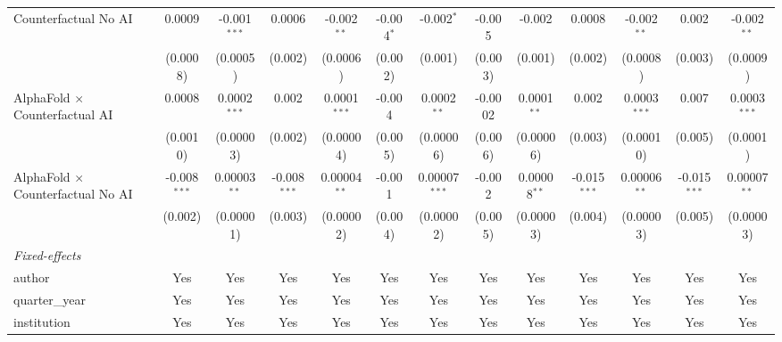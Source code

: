 \begin{tabular}{lcccccccccccc}
   Counterfactual No AI                     & 0.0009         & -0.001$^{***}$ & 0.0006         & -0.002$^{**}$  & -0.004$^{*}$   & -0.002$^{*}$    & -0.005         & -0.002         & 0.0008         & -0.002$^{**}$  & 0.002          & -0.002$^{**}$\\   
                                            & (0.0008)       & (0.0005)       & (0.002)        & (0.0006)       & (0.002)        & (0.001)         & (0.003)        & (0.001)        & (0.002)        & (0.0008)       & (0.003)        & (0.0009)\\   
   AlphaFold $\times$ Counterfactual AI     & 0.0008         & 0.0002$^{***}$ & 0.002          & 0.0001$^{***}$ & -0.004         & 0.0002$^{**}$   & -0.0002        & 0.0001$^{**}$  & 0.002          & 0.0003$^{***}$ & 0.007          & 0.0003$^{***}$\\   
                                            & (0.0010)       & (0.00003)      & (0.002)        & (0.00004)      & (0.005)        & (0.00006)       & (0.006)        & (0.00006)      & (0.003)        & (0.00010)      & (0.005)        & (0.0001)\\   
   AlphaFold $\times$ Counterfactual No AI  & -0.008$^{***}$ & 0.00003$^{**}$ & -0.008$^{***}$ & 0.00004$^{**}$ & -0.001         & 0.00007$^{***}$ & -0.002         & 0.00008$^{**}$ & -0.015$^{***}$ & 0.00006$^{**}$ & -0.015$^{***}$ & 0.00007$^{**}$\\   
                                            & (0.002)        & (0.00001)      & (0.003)        & (0.00002)      & (0.004)        & (0.00002)       & (0.005)        & (0.00003)      & (0.004)        & (0.00003)      & (0.005)        & (0.00003)\\   
   \midrule
   \emph{Fixed-effects}\\
   author                                   & Yes            & Yes            & Yes            & Yes            & Yes            & Yes             & Yes            & Yes            & Yes            & Yes            & Yes            & Yes\\  
   quarter\_year                            & Yes            & Yes            & Yes            & Yes            & Yes            & Yes             & Yes            & Yes            & Yes            & Yes            & Yes            & Yes\\  
   institution                              & Yes            & Yes            & Yes            & Yes            & Yes            & Yes             & Yes            & Yes            & Yes            & Yes            & Yes            & Yes\\  

\end{tabular}
